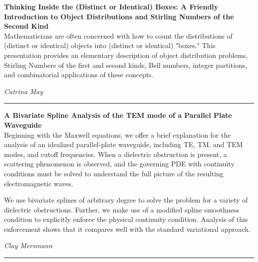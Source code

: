 \documentclass[oneside]{amsart}
\begin{document}
\filbreak
\hspace{-20pt}\textbf{ \textbf{ Thinking Inside the (Distinct or Identical) Boxes: A Friendly Introduction to Object Distributions and Stirling Numbers of the Second Kind } } \vspace{0.5em}\\
Mathematicians are often concerned with how to count the distributions of (distinct or identical) objects into (distinct or identical) "boxes." This presentation provides an elementary description of object distribution problems, Stirling Numbers of the first and second kinds, Bell numbers, integer partitions, and combinatorial applications of these concepts. \vspace{-1em}\\
\begin{flushright} \textit{ Catrina May } \vspace{0.5em} \end{flushright}
\rule{\textwidth}{0.4pt}
\vspace{0.5em}

\filbreak
\hspace{-20pt}\textbf{ \textbf{ A Bivariate Spline Analysis of the TEM mode of a Parallel Plate Waveguide } } \vspace{0.5em}\\
Beginning with the Maxwell equations, we offer a brief explanation for the analysis of an idealized parallel-plate waveguide, including TE, TM, and TEM modes, and cutoff frequencies. When a dielectric obstruction is present, a scattering phenomenon is observed, and the governing PDE with continuity conditions must be solved to understand the full picture of the resulting electromagnetic waves. 

We use bivariate splines of arbitrary degree to solve the problem for a variety of dielectric obstructions. Further, we make use of a modified spline smoothness condition to explicitly enforce the physical continuity condition. Analysis of this enforcement shows that it compares well with the standard variational approach. \vspace{-1em}\\
\begin{flushright} \textit{ Clay Mersmann } \vspace{0.5em} \end{flushright}
\rule{\textwidth}{0.4pt}
\vspace{0.5em}
\end{document}
